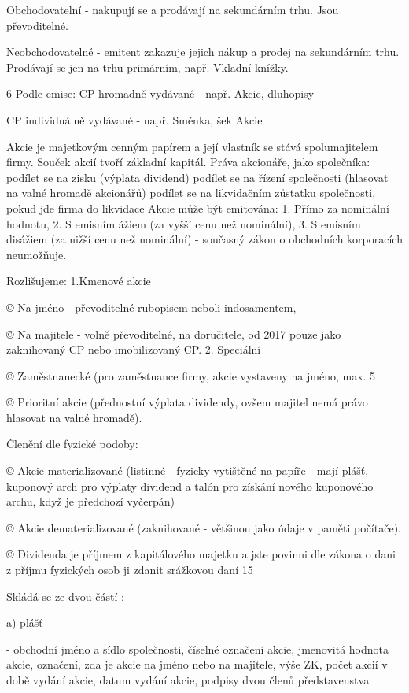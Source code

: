 Obchodovatelní - nakupují se a prodávají na sekundárním trhu. Jsou převoditelné.

Neobchodovatelné - emitent zakazuje jejich nákup a prodej na sekundárním trhu. Prodávají se jen na trhu primárním, např. Vkladní
knížky.

6 Podle emise:
CP hromadně vydávané - např. Akcie, dluhopisy

CP individuálně vydávané - např. Směnka, šek
\newpage
Akcie



Akcie je majetkovým cenným papírem a její vlastník se stává spolumajitelem firmy. Souček akcií tvoří základní kapitál.
Práva akcionáře, jako společníka:
podílet se na zisku (výplata dividend)
podílet se na řízení společnosti (hlasovat na valné hromadě akcionářů)
podílet se na likvidačním zůstatku společnosti, pokud jde firma do likvidace
Akcie může být emitována:
1. Přímo za nominální hodnotu,
2. S emisním ážiem (za vyšší cenu než nominální),
3. S emisním disážiem (za nižší cenu než nominální) - současný zákon o obchodních korporacích neumožňuje.

Rozlišujeme:
1.Kmenové akcie

© Na jméno - převoditelné rubopisem neboli indosamentem,

© Na majitele - volně převoditelné, na doručitele, od 2017 pouze jako zaknihovaný CP nebo imobilizovaný CP.
2. Speciální

© Zaměstnanecké (pro zaměstnance firmy, akcie vystaveny na jméno, max. 5%

© Prioritní akcie (přednostní výplata dividendy, ovšem majitel nemá právo hlasovat na valné hromadě).

Členění dle fyzické podoby:

© Akcie materializované (listinné - fyzicky vytištěné na papíře - mají plášť, kuponový arch pro výplaty dividend a talón pro
získání nového kuponového archu, když je předchozí vyčerpán)

© Akcie dematerializované (zaknihované - většinou jako údaje v paměti počítače).

© Dividenda je příjmem z kapitálového majetku a jste povinni dle zákona o dani z příjmu fyzických osob ji zdanit srážkovou
daní 15%

Skládá se ze dvou částí :

a) plášť

- obchodní jméno a sídlo společnosti, číselné označení akcie, jmenovitá hodnota akcie, označení, zda je akcie na jméno nebo na
majitele, výše ZK, počet akcií v době vydání akcie, datum vydání akcie, podpisy dvou členů představenstva

